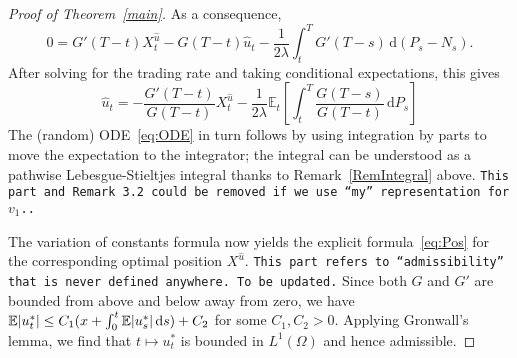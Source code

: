 \documentclass[11pt]{article}
\theoremstyle{definition}
\theoremstyle{remark}
\newcommand{\E}{\mathbb{E}} %
\DeclarePairedDelimiter{\abs}{\lvert}{\rvert} %
\newcommand{\ts}{\textstyle}
\newcommand{\de}{\,\mathrm{d}}
\begin{document}
\begin{proof}[Proof of Theorem~\ref{main}]
As a consequence,
$$
0=G'(T-t)X^{\hat{u}}_t-G(T-t)\hat{u}_t-\frac{1}{2\lambda}\int_t^T G'(T-s) \de (P_s-N_s).
$$
After solving for the trading rate and taking conditional expectations, this gives
$$
\hat{u}_t = -\frac{G'(T-t)}{G(T-t)} X^{\hat{u}}_t - \frac{1}{2\lambda} \E_t\left[\int_t^T\frac{G(T-s)}{G(T-t)} \de P_s\right]
$$
The (random) ODE~\eqref{eq:ODE} in turn follows by using integration by parts to move the expectation to the integrator; the integral can be understood as a pathwise Lebesgue-Stieltjes integral thanks to Remark~\ref{RemIntegral} above. \texttt{This part and Remark 3.2 could be removed if we use ``my'' representation for $v_1$..}

The variation of constants formula now yields the explicit formula~\eqref{eq:Pos} for the corresponding optimal position $X^{\hat{u}}$.
\texttt{This part refers to ``admissibility'' that is never defined anywhere. To be updated.}
Since both $G$ and $G'$ are bounded from above and below away from zero, we have $\E\abs{u^\ast_t} \le C_1 (x+\int_0^t \E\abs{u^\ast_s} \de s) + C_2$ for some $C_1, C_2 > 0$. Applying Gronwall's lemma, we find that $t\mapsto u^\ast_t$ is bounded in $L^1(\Omega)$ and hence admissible.



\end{proof}
\end{document}
